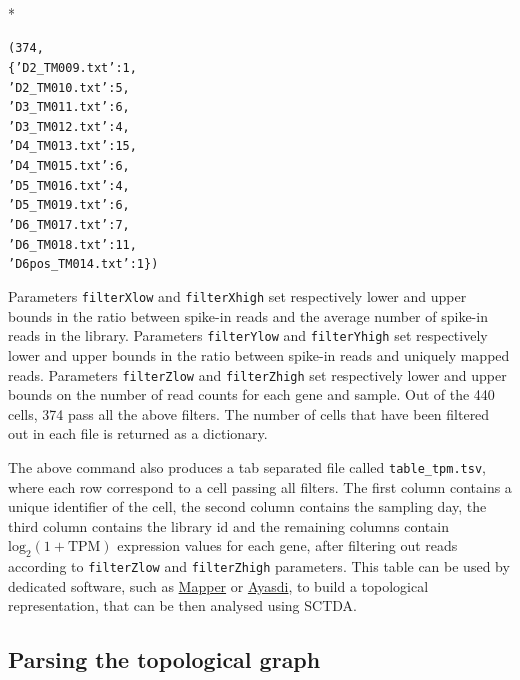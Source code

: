 \documentclass[letterpaper,10pt,english]{/usr/share/sphinx/texinputs/sphinxhowto}
\def\smaller{\fontsize{9.5pt}{9.5pt}\selectfont}
\newenvironment{InvisibleVerbatim}
        {\begin{mdframed}[leftmargin=0.1\linewidth,innerleftmargin=3pt,innerrightmargin=3pt, userdefinedwidth=1\linewidth, linewidth=0pt, linecolor=white, usetwoside=false]}
        {\end{mdframed}}
\begin{document}
        

            
                \makebox[0.1\linewidth]{\smaller\hfill\tt\color{nbframe-out-prompt}Out\hspace{4pt}{[}4{]}:\hspace{4pt}}\\*
                \vspace{-1.9\baselineskip}\begin{InvisibleVerbatim}
\begin{alltt}(374,
 \{'D2\_TM009.txt': 1,
  'D2\_TM010.txt': 5,
  'D3\_TM011.txt': 6,
  'D3\_TM012.txt': 4,
  'D4\_TM013.txt': 15,
  'D4\_TM015.txt': 6,
  'D5\_TM016.txt': 4,
  'D5\_TM019.txt': 6,
  'D6\_TM017.txt': 7,
  'D6\_TM018.txt': 11,
  'D6pos\_TM014.txt': 1\})\end{alltt}

            \end{InvisibleVerbatim}
            
        
    
Parameters \texttt{filterXlow} and \texttt{filterXhigh} set respectively lower and upper
bounds in the ratio between spike-in reads and the average number of
spike-in reads in the library. Parameters \texttt{filterYlow} and \texttt{filterYhigh} set
respectively lower and upper bounds in the ratio between spike-in reads
and uniquely mapped reads. Parameters \texttt{filterZlow} and \texttt{filterZhigh} set
respectively lower and upper bounds on the number of read counts for
each gene and sample. Out of the 440 cells, 374 pass all the above
filters. The number of cells that have been filtered out in each file is
returned as a dictionary.

The above command also produces a tab separated file called
\texttt{table\_tpm.tsv}, where each row correspond to a cell passing all filters.
The first column contains a unique identifier of the cell, the second
column contains the sampling day, the third column contains the library
id and the remaining columns contain $\textrm{log}_2(1+\textrm{TPM})$ expression values for
each gene, after filtering out reads according to \texttt{filterZlow} and
\texttt{filterZhigh} parameters. This table can be used by dedicated software,
such as \href{http://danifold.net/mapper/}{Mapper} or \href{http://www.ayasdi.com/}{Ayasdi}, to build a topological representation, that
can be then analysed using SCTDA.

\subsection{Parsing the topological graph}
\end{document}
